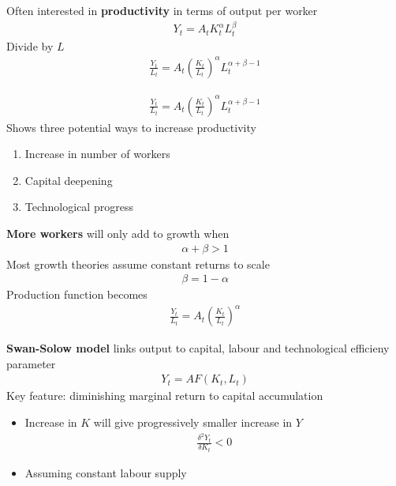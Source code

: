 \documentclass{beamer}
\begin{document}
\begin{frame}
 Often interested in \textbf{productivity} in terms of output per worker
 \begin{align}
  Y_t=A_tK^{\alpha}_tL^{\beta}_t
\end{align}
\medskip
Divide by $L$
 \begin{align}
  \frac{Y_t}{L_t}= A_t \left(\frac{K_t}{L_t} \right)^{\alpha}L_t^{\alpha + \beta -1}
 \end{align} 
\end{frame}


\begin{frame}
\begin{align*}
  \frac{Y_t}{L_t}= A_t \left(\frac{K_t}{L_t} \right)^{\alpha}L_t^{\alpha + \beta -1}
 \end{align*} 
Shows three potential ways to increase productivity
 \begin{enumerate}
   \item Increase in number of workers
   \item Capital deepening
   \item Technological progress
 \end{enumerate}
\end{frame}


\begin{frame}
  \textbf{More workers} will only add to growth when
  \begin{align}
    \alpha+\beta>1
  \end{align}
  \medskip
  Most growth theories assume constant returns to scale
  \begin{align}
    \beta=1-\alpha
  \end{align}
  Production function becomes
  \begin{align}
    \frac{Y_t}{L_t}= A_t \left(\frac{K_t}{L_t} \right)^{\alpha}
  \end{align}
\end{frame}

\begin{frame}
  \textbf{Swan-Solow model} links output to capital, labour and technological efficieny parameter
  \begin{align}
    Y_t = AF(K_t,L_t) 
  \end{align}
   \medskip
  Key feature: diminishing marginal return to capital accumulation
  \begin{itemize}
    \item Increase in $K$ will give progressively smaller increase in $Y$
    \begin{align*}
       \frac{\delta^2Y_t}{\delta K_t}<0    
    \end{align*}
    \item Assuming constant labour supply
  \end{itemize}
\end{frame}
\end{document}
